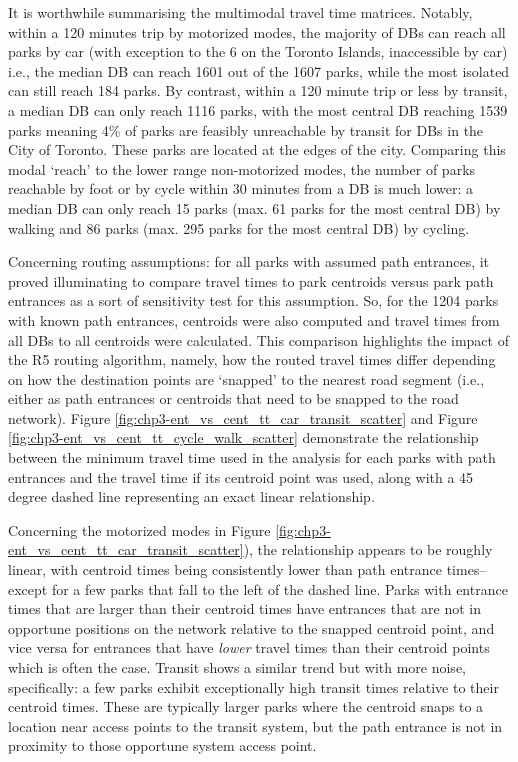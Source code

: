 \documentclass[
11pt, %
oneside, %
english, %
singlespacing, %
]{macthesis} %
\begin{document}
It is worthwhile summarising the multimodal travel time matrices. Notably, within a 120 minutes trip by motorized modes, the majority of DBs can reach all parks by car (with exception to the 6 on the Toronto Islands, inaccessible by car) i.e., the median DB can reach 1601 out of the 1607 parks, while the most isolated can still reach 184 parks. By contrast, within a 120 minute trip or less by transit, a median DB can only reach 1116 parks, with the most central DB reaching 1539 parks meaning 4\% of parks are feasibly unreachable by transit for DBs in the City of Toronto. These parks are located at the edges of the city. Comparing this modal `reach' to the lower range non-motorized modes, the number of parks reachable by foot or by cycle within 30 minutes from a DB is much lower: a median DB can only reach 15 parks (max. 61 parks for the most central DB) by walking and 86 parks (max. 295 parks for the most central DB) by cycling.

Concerning routing assumptions: for all parks with assumed path entrances, it proved illuminating to compare travel times to park centroids versus park path entrances as a sort of sensitivity test for this assumption. So, for the 1204 parks with known path entrances, centroids were also computed and travel times from all DBs to all centroids were calculated. This comparison highlights the impact of the R5 routing algorithm, namely, how the routed travel times differ depending on how the destination points are `snapped' to the nearest road segment (i.e., either as path entrances or centroids that need to be snapped to the road network). Figure \ref{fig:chp3-ent_vs_cent_tt_car_transit_scatter} and Figure \ref{fig:chp3-ent_vs_cent_tt_cycle_walk_scatter} demonstrate the relationship between the minimum travel time used in the analysis for each parks with path entrances and the travel time if its centroid point was used, along with a 45 degree dashed line representing an exact linear relationship.

Concerning the motorized modes in Figure \ref{fig:chp3-ent_vs_cent_tt_car_transit_scatter}), the relationship appears to be roughly linear, with centroid times being consistently lower than path entrance times--except for a few parks that fall to the left of the dashed line. Parks with entrance times that are larger than their centroid times have entrances that are not in opportune positions on the network relative to the snapped centroid point, and vice versa for entrances that have \emph{lower} travel times than their centroid points which is often the case. Transit shows a similar trend but with more noise, specifically: a few parks exhibit exceptionally high transit times relative to their centroid times. These are typically larger parks where the centroid snaps to a location near access points to the transit system, but the path entrance is not in proximity to those opportune system access point.
\end{document}
